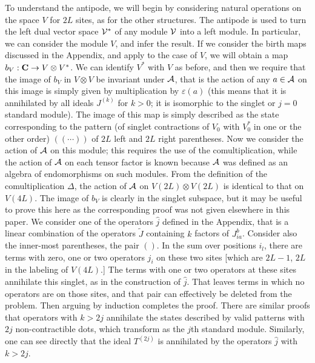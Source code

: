 \documentclass[twocolumn,floats,pra]{revtex4}
\def \cA {{\cal A}}
\begin{document}
To understand the antipode, we will begin by considering natural
operations on the space $V$ for $2L$ sites, as for the other
structures. The antipode is used to turn the left dual vector
space ${\cal V}^*$ of any module $\cal V$ into a left module. In
particular, we can consider the module $V$, and infer the result.
If we consider the birth maps discussed in the Appendix, and apply
to the case of $V$, we will obtain a map $b_V:{\bf C}\to V\otimes
V^*$. We can identify $V^*$ with $V$ as before, and then we
require that the image of $b_V$ in $V\otimes V$ be invariant under
$\cA$, that is the action of any $a\in\cA$ on this image is simply
given by multiplication by $\varepsilon(a)$ (this means that it is
annihilated by all ideals $J^{(k)}$ for $k>0$; it is isomorphic to
the singlet or $j=0$ standard module). The image of this map is
simply described as the state corresponding to the pattern (of
singlet contractions of $V_0$ with $V_0^*$ in one or the other
order) $((\cdots))$ of $2L$ left and $2L$ right parentheses. Now
we consider the action of $\cA$ on this module; this requires the
use of the comultiplication, while the action of $\cA$ on each
tensor factor is known because $\cA$ was defined as an algebra of
endomorphisms on such modules. From the definition of the
comultiplication $\Delta$, the action of $\cA$ on $V(2L)\otimes
V(2L)$ is identical to that on $V(4L)$. The image of $b_V$ is
clearly in the singlet subspace, but it may be useful to prove
this here as the corresponding proof was not given elsewhere in
this paper. We consider one of the operators $\widehat{j}$ defined
in the Appendix, that is a linear combination of the operators
$\widetilde{J}$ containing $k$ factors of $J_{ia}^b$. Consider
also the inner-most parentheses, the pair $()$. In the sum over
positions $i_l$, there are terms with zero, one or two operators
$j_i$ on these two sites [which are $2L-1$, $2L$ in the labeling
of $V(4L)$.] The terms with one or two operators at these sites
annihilate this singlet, as in the construction of $\widehat{j}$.
That leaves terms in which no operators are on those sites, and
that pair can effectively be deleted from the problem. Then
arguing by induction completes the proof. There are similar proofs
that operators with $k>2j$ annihilate the states described by
valid patterns with $2j$ non-contractible dots, which transform as
the $j$th standard module. Similarly, one can see directly that
the ideal $T^{(2j)}$ is annihilated by the operators $\widehat{j}$
with $k>2j$.
\end{document}
